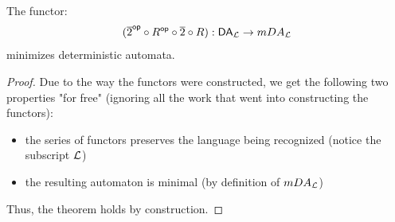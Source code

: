 
\begin{theorem}
  The functor:
  \begin{equation}
    (\overline{2}^{\mathsf{op}} \circ R^{\mathsf{op}} \circ \overline{2} \circ R) : \mathsf{DA}_\mathcal L \rightarrow mDA_\mathcal L
  \end{equation}
  minimizes deterministic automata.
\end{theorem}

\begin{proof}
  
Due to the way the functors were constructed, we get the following two properties "for free" (ignoring all the work that went into constructing the functors):

\begin{itemize}
\item the series of functors preserves the language being recognized (notice the subscript $\mathcal L$)
\item the resulting automaton is minimal (by definition of $mDA_\mathcal L$)
\end{itemize}

Thus, the theorem holds by construction.
\end{proof}
